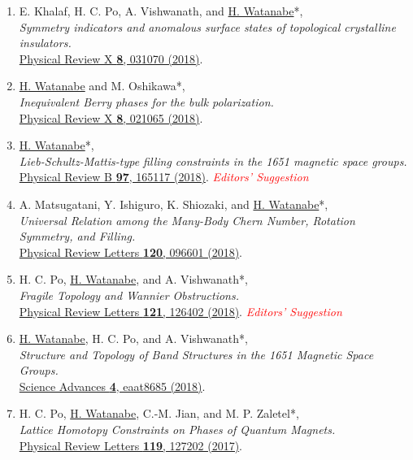 \documentclass[letterpaper,11pt]{article}
\begin{document}
\begin{enumerate}
\item E. Khalaf, H. C. Po, A. Vishwanath, and \underline{H. Watanabe}*, \\\emph{Symmetry indicators and anomalous surface states of topological crystalline insulators.}\\{\href{https://doi.org/10.1103/PhysRevX.8.031070}{Physical Review X {\bf 8}, 031070 (2018)}.}

\item \underline{H. Watanabe} and M. Oshikawa*, \\\emph{Inequivalent Berry phases for the bulk polarization.}\\{\href{https://doi.org/10.1103/PhysRevX.8.021065}{Physical Review X {\bf 8}, 021065 (2018)}.}

\item \underline{H. Watanabe}*, \\\emph{Lieb-Schultz-Mattis-type filling constraints in the 1651 magnetic space groups.}\\{\href{https://doi.org/10.1103/PhysRevB.97.165117}{Physical Review B {\bf 97}, 165117 (2018)}.} \emph{\small \textcolor{red}{Editors' Suggestion}}

\item A. Matsugatani, Y. Ishiguro, K. Shiozaki, and \underline{H. Watanabe}*, \\\emph{Universal Relation among the Many-Body Chern Number, Rotation Symmetry, and Filling.}\\{\href{https://doi.org/10.1103/PhysRevLett.120.096601}{Physical Review Letters {\bf 120}, 096601 (2018)}.}

\item H. C. Po, \underline{H. Watanabe}, and A. Vishwanath*, \\\emph{Fragile Topology and Wannier Obstructions.}\\{\href{https://doi.org/10.1103/PhysRevLett.121.126402}{Physical Review Letters {\bf 121}, 126402 (2018)}. \emph{\small \textcolor{red}{Editors' Suggestion}}}

\item \underline{H. Watanabe}, H. C. Po, and A. Vishwanath*, \\\emph{Structure and Topology of Band Structures in the 1651 Magnetic Space Groups.}\\{\href{https://doi.org/10.1126/sciadv.aat8685}{Science Advances {\bf 4}, eaat8685 (2018)}.}


\item H. C. Po, \underline{H. Watanabe}, C.-M. Jian, and  M. P. Zaletel*, \\\emph{Lattice Homotopy Constraints on Phases of Quantum Magnets.}\\{\href{https://doi.org/10.1103/PhysRevLett.119.127202}{Physical Review Letters {\bf 119}, 127202 (2017)}.}


\end{enumerate}
\end{document}
